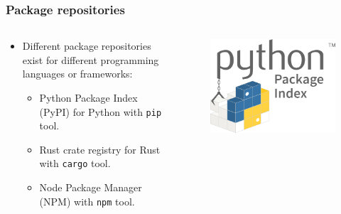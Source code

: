 \documentclass[aspectratio=169]{beamer}              %
\begin{document}
\begin{frame}
	\frametitle{Package repositories}
	
\begin{columns}
	\begin{column}{0.5\textwidth}
		\begin{itemize}
			\item Different package repositories exist for different programming languages or frameworks:
			\begin{itemize}
				\item Python Package Index (PyPI) for Python with \texttt{pip} tool.\footnotemark
				\item Rust crate registry for Rust with \texttt{cargo} tool.\footnotemark
				\item Node Package Manager (NPM) with \texttt{npm} tool.\footnotemark
			\end{itemize}
		\end{itemize}
	\end{column}
	\begin{column}{0.5\textwidth}
	\begin{figure}[ht!]
	\begin{center}
  	  \includegraphics[width=\textwidth]{img/pypi.png}
	\end{center}
	\end{figure}
	\end{column}
\end{columns}

\end{frame}
\end{document}
